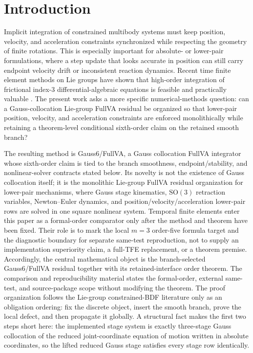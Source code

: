 \documentclass[preprint,12pt]{elsarticle}
\newcommand{\method}{Gauss6\slash FullVA}
\newcommand{\tfe}{TFE}
\begin{document}
\section{Introduction}

Implicit integration of constrained multibody systems must keep position,
velocity, and acceleration constraints synchronized while respecting the
geometry of finite rotations. This is especially important for absolute- or
lower-pair formulations, where a step update that looks accurate in position
can still carry endpoint velocity drift or inconsistent reaction dynamics.
Recent time finite element methods on Lie groups have shown that high-order
integration of frictional index-3 differential-algebraic equations is feasible
and practically valuable \cite{chaturvedi2026tfe}. The present work asks a
more specific numerical-methods question: can a Gauss-collocation Lie-group
FullVA residual be organized so that lower-pair position, velocity, and
acceleration constraints are enforced monolithically while retaining a
theorem-level conditional sixth-order claim on the retained smooth branch?

The resulting method is \method{}, a Gauss collocation FullVA integrator whose
sixth-order claim is tied to the branch smoothness, endpoint/stability, and
nonlinear-solver contracts stated below. Its novelty is not the existence
of Gauss collocation itself; it is the monolithic Lie-group FullVA residual
organization for lower-pair mechanisms, where Gauss stage kinematics,
$\mathrm{SO}(3)$ retraction variables, Newton--Euler dynamics, and
position/velocity/acceleration lower-pair rows are solved in one square
nonlinear system. Temporal finite elements enter this paper as a formal-order
comparator only after the method and theorem have been fixed.  Their role is
to mark the local \(m=3\) order-five formula target and the diagnostic
boundary for separate same-test reproduction, not to supply an implementation
superiority claim, a full-\tfe{} replacement, or a theorem premise.
Accordingly, the central mathematical object is the branch-selected
\method{} residual together with its retained-interface order theorem. The
comparison and reproducibility material states the formal-order, external
same-test, and source-package scope without modifying the theorem.
The proof organization follows the Lie-group constrained-BDF literature
\cite{wieloch2021bdf} only as an obligation ordering: fix the discrete
object, insert the smooth branch, prove the local defect, and then propagate
it globally. A structural fact makes the first two steps short here: the
implemented stage system is exactly three-stage Gauss collocation of the
reduced joint-coordinate equation of motion written in absolute coordinates,
so the lifted reduced Gauss stage satisfies every stage row identically.
\end{document}

